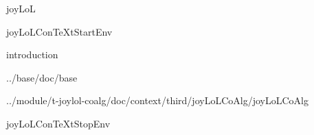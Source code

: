 
\usemodule[t-diSimp]

\startDiSimpComponent joyLoL

\diSimpEnvironment joyLoLConTeXtStartEnv

\diSimpComponent introduction


\diSimpComponent ../base/doc/base



\diSimpComponent ../module/t-joylol-coalg/doc/context/third/joyLoLCoAlg/joyLoLCoAlg

\diSimpEnvironment joyLoLConTeXtStopEnv

\stopDiSimpComponent

